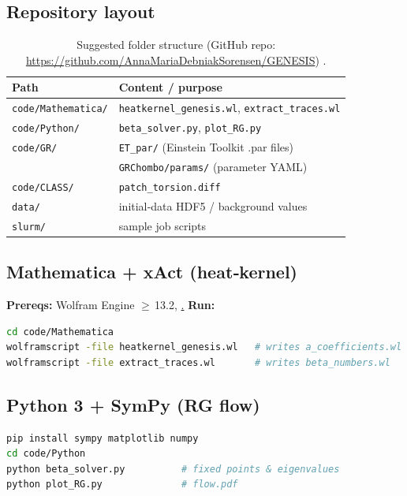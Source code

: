 \documentclass{article}
\begin{document}
\subsection{Repository layout}
\begin{table}[h]
\centering
\begin{tabular}{@{}ll@{}}
\toprule
\textbf{Path} & \textbf{Content / purpose} \\ \midrule
\texttt{code/Mathematica/} & \texttt{heatkernel\_genesis.wl}, \texttt{extract\_traces.wl} \\
\texttt{code/Python/}      & \texttt{beta\_solver.py}, \texttt{plot\_RG.py}               \\
\texttt{code/GR/}          & \texttt{ET\_par/} (Einstein Toolkit .par files)              \\
                           & \texttt{GRChombo/params/} (parameter YAML)                   \\
\texttt{code/CLASS/}       & \texttt{patch\_torsion.diff}                                 \\
\texttt{data/}             & initial‑data HDF5 / background values                       \\
\texttt{slurm/}            & sample job scripts                                           \\ \bottomrule
\end{tabular}
\caption{Suggested folder structure (GitHub repo: \url{https://github.com/AnnaMariaDebniakSorensen/GENESIS})
.}
\label{tab:repo}
\end{table}

\subsection*{Mathematica + xAct (heat‑kernel)}
\textbf{Prereqs:} Wolfram Engine $\ge$ 13.2, \href{https://www.xact.es}.  
\textbf{Run:}
\begin{lstlisting}[language=bash,basicstyle=\ttfamily\small]
cd code/Mathematica
wolframscript -file heatkernel_genesis.wl   # writes a_coefficients.wl
wolframscript -file extract_traces.wl       # writes beta_numbers.wl
\end{lstlisting}


\subsection*{Python 3 + SymPy (RG flow)}
\begin{lstlisting}[language=bash,basicstyle=\ttfamily\small]
pip install sympy matplotlib numpy
cd code/Python
python beta_solver.py          # fixed points & eigenvalues
python plot_RG.py              # flow.pdf
\end{lstlisting}              
\end{document}

